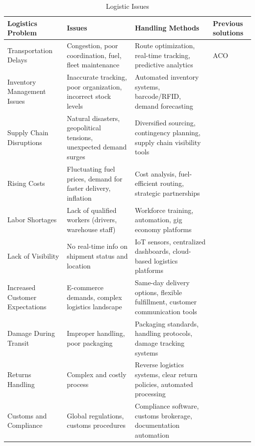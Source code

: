 \begin{table}[h]
\caption{Logistic Issues}
\centering
\renewcommand{\arraystretch}{1.3} %
\begin{tabular}{|p{3cm}|p{4cm}|p{4cm}|p{2.5cm}|}

\hline
\textbf{Logistics Problem} & \textbf{Issues} & \textbf{Handling Methods} & \textbf{Previous solutions} \\
\hline
Transportation Delays & Congestion, poor coordination, fuel, fleet maintenance & Route optimization, real-time tracking, predictive analytics & ACO \\
Inventory Management Issues & Inaccurate tracking, poor organization, incorrect stock levels & Automated inventory systems, barcode/RFID, demand forecasting \\
Supply Chain Disruptions & Natural disasters, geopolitical tensions, unexpected demand surges & Diversified sourcing, contingency planning, supply chain visibility tools \\
Rising Costs & Fluctuating fuel prices, demand for faster delivery, inflation & Cost analysis, fuel-efficient routing, strategic partnerships \\
Labor Shortages & Lack of qualified workers (drivers, warehouse staff) & Workforce training, automation, gig economy platforms \\
Lack of Visibility & No real-time info on shipment status and location & IoT sensors, centralized dashboards, cloud-based logistics platforms \\
Increased Customer Expectations & E-commerce demands, complex logistics landscape & Same-day delivery options, flexible fulfillment, customer communication tools \\
Damage During Transit & Improper handling, poor packaging & Packaging standards, handling protocols, damage tracking systems \\
Returns Handling & Complex and costly process & Reverse logistics systems, clear return policies, automated processing \\
Customs and Compliance & Global regulations, customs procedures & Compliance software, customs brokerage, documentation automation \\
\hline
\end{tabular}
\end{table}